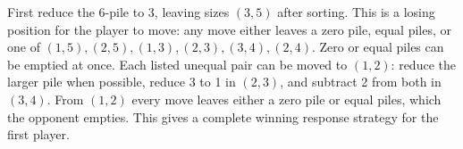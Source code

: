 First reduce the 6-pile to 3, leaving sizes $(3,5)$ after sorting. This is a losing position for the player to move: any move either leaves a zero pile, equal piles, or one of $(1,5),(2,5),(1,3),(2,3),(3,4),(2,4)$. Zero or equal piles can be emptied at once. Each listed unequal pair can be moved to $(1,2)$: reduce the larger pile when possible, reduce 3 to 1 in $(2,3)$, and subtract 2 from both in $(3,4)$. From $(1,2)$ every move leaves either a zero pile or equal piles, which the opponent empties. This gives a complete winning response strategy for the first player.
